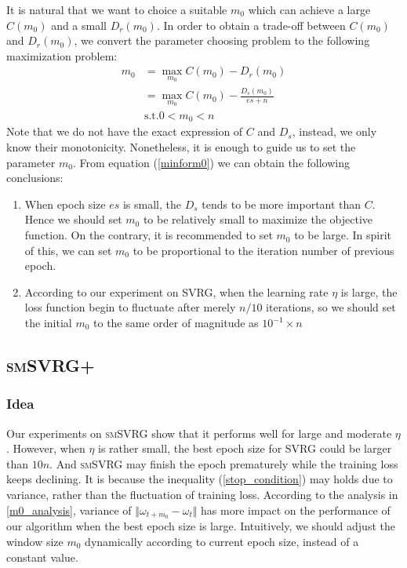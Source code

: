 \documentclass[conference]{IEEEtran}
\begin{document}
It is natural that we want to choice a suitable $m_0$  which can achieve a large $C(m_0)$ and a small $D_r(m_0)$. In order to obtain a trade-off between $C(m_0)$ and $D_r(m_0)$, we convert the parameter choosing problem to the following maximization problem:
\begin{equation}
\label{minform0}
\begin{split}
m_0 &= \max\limits_{m_0} C(m_0)-D_r(m_0)\\
&= \max\limits_{m_0} C(m_0)-\frac{D_s(m_0)}{es+n}\\
&\textrm{s.t.} 0<m_0<n
\end{split}
\end{equation}
Note that we do not have the exact expression of $C$ and $D_s$, instead, we only know their monotonicity. Nonetheless, it is enough to guide us to set the parameter $m_0$. From equation (\ref{minform0}) we can obtain the following conclusions:
\begin{enumerate}
\item When epoch size $es$ is small, the $D_s$ tends to be more important than $C$. Hence we should set $m_0$ to be relatively small to maximize the objective function. On the contrary, it is recommended to set $m_0$ to be large. In spirit of this, we can set $m_0$ to be proportional to the iteration number of previous epoch.
\item According to our experiment on SVRG, when the learning rate $\eta$ is large, the loss function begin to fluctuate after merely $n/10$ iterations, so we should set the initial $m_0$ to the same order of magnitude as $10^{-1} \times n$
 \end{enumerate}
 
 \subsection{\textsc{smSVRG+}}
 \subsubsection{Idea}
 Our experiments on \textsc{smSVRG} show that it performs well for large and moderate $\eta$. However, when $\eta$ is rather small, the best epoch size for SVRG could be larger than $10n$. And \textsc{smSVRG} may finish the epoch prematurely while the training loss keeps declining. It is because the inequality (\ref{stop_condition}) may holds due to variance, rather than the fluctuation of training loss. According to the analysis in \ref{m0_analysis}, variance of $\Vert\omega_{t+m_0}-\omega_t\Vert$ has more impact on the performance of our algorithm when the best epoch size is large. Intuitively, we should adjust the window size $m_0$ dynamically according to current epoch size, instead of a constant value.
\end{document}
